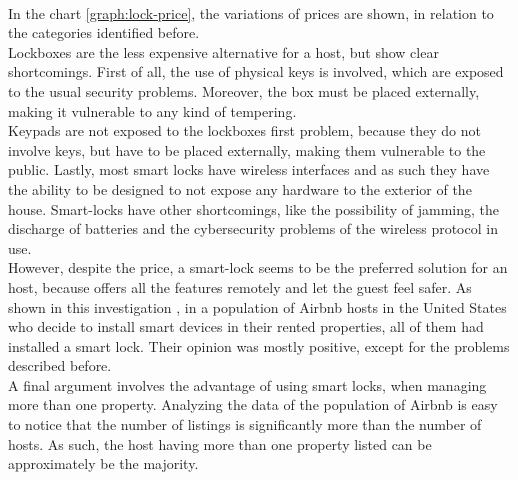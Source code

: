 \\ In the chart \ref{graph:lock-price}, the variations of prices are shown, in relation to the categories identified before.
\\ Lockboxes are the less expensive alternative for a host, but show clear shortcomings. First of all, the use of physical keys is involved, which are exposed to the usual security problems. Moreover, the box must be placed externally, making it vulnerable to any kind of tempering. 
\\ Keypads are not exposed to the lockboxes first problem, because they do not involve keys, but have to be placed externally, making them vulnerable to the public. 
Lastly, most smart locks have wireless interfaces and as such they have the ability to be designed to not expose any hardware to the exterior of the house. Smart-locks have other shortcomings, like the possibility of jamming, the discharge of batteries and the cybersecurity problems of the wireless protocol in use.  
\\ However, despite the price, a smart-lock seems to be the preferred solution for an host, because offers all the features remotely and let the guest feel safer. 
As shown in this investigation \cite{10.1145/3334480.3382900}, in a population of Airbnb hosts in the United States who decide to install smart devices in their rented properties, all of them had installed a smart lock. Their opinion was mostly positive, except for the problems described before. 
\\ A final argument involves the advantage of using smart locks, when managing more than one property. Analyzing the data of the population of Airbnb\cite{airbnbaboutus} is easy to notice that the number of listings is significantly more than the number of hosts. As such, the host having more than one property listed can be approximately be the majority. 
